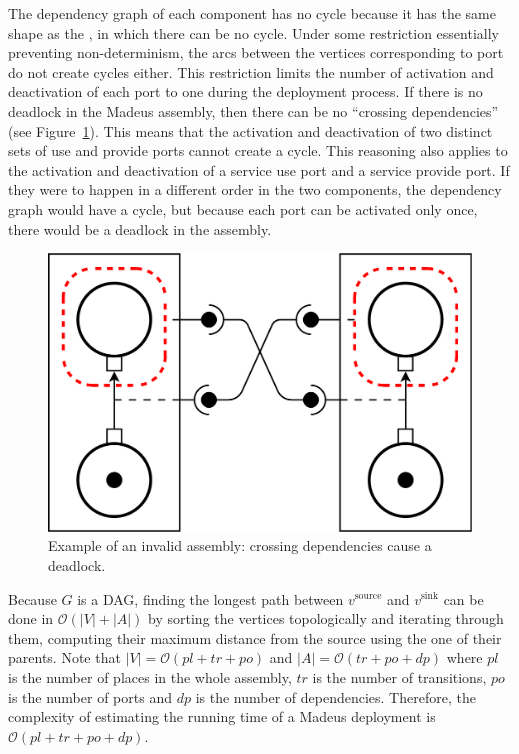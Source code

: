 The dependency graph of each component has no cycle because it has the same
shape as the \net, in which there can be no cycle. Under some restriction
essentially preventing non-determinism, the arcs between the vertices
corresponding to port do not create cycles either. This restriction limits
the number of activation and deactivation of each port to one during the
deployment process. If there is no deadlock in the Madeus assembly, then
there can be no ``crossing dependencies'' (see Figure~\ref{fig:deadlock}). This means that
the activation and deactivation of two distinct sets of use and provide
ports cannot create a cycle. This reasoning also applies to the activation
and deactivation of a service use port and a service provide port. If they
were to happen in a different order in the two components, the dependency
graph would have a cycle, but because each port can be activated only once,
there would be a deadlock in the assembly.

\begin{figure}[h]
  \begin{center}
    \includegraphics[width=0.7\linewidth]{./images/deadlock.pdf}
  \end{center}
  \caption{Example of an invalid assembly: crossing dependencies cause a deadlock.}
  \label{fig:deadlock}
\end{figure}

Because $G$ is a DAG, finding the longest path between $v^\text{source}$
and $v^\text{sink}$ can be done in $\mathcal{O}(|V|+|A|)$ by sorting the
vertices topologically and iterating through them, computing their maximum
distance from the source using the one of their parents. Note that
$|V| = \mathcal{O}(pl+tr+po)$ and $|A| = \mathcal{O}(tr+po+dp)$ where $pl$
is the number of places in the whole assembly, $tr$ is the number of
transitions, $po$ is the number of ports and $dp$ is the number of
dependencies. Therefore, the complexity of estimating the running time of
a Madeus deployment is $\mathcal{O}(pl+tr+po+dp)$.


